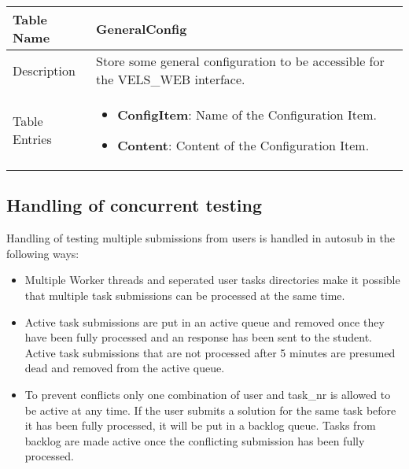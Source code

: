 \begin{tabular}{|p{3cm}|p{10cm}|}
\hline
Table Name & GeneralConfig \\
\hline
Description & Store some general configuration to be accessible for the
VELS\_WEB interface. \\
\hline
Table Entries & \begin{itemize}
    \item {\bf ConfigItem}: Name of the Configuration Item.
    \item {\bf Content}: Content of the Configuration Item.
    \end{itemize} \\
\hline
\end{tabular}

\subsection{Handling of concurrent testing}
Handling of testing multiple submissions from users is handled in autosub in the following ways:
\begin{itemize}
\item Multiple Worker threads and seperated user tasks directories make it possible that
    multiple task submissions can be processed at the same time.
\item Active task submissions are put in an active queue and removed once they have been fully
    processed and an response has been sent to the student. Active task submissions that are
    not processed after 5 minutes are presumed dead and removed from the active queue.
\item To prevent conflicts only one combination of user and task\_nr is allowed to be active at any
    time. If the user submits a solution for the same task before it has been fully processed, it
    will be put in a backlog queue. Tasks from backlog are made active once the conflicting
    submission has been fully processed.
\end{itemize}

